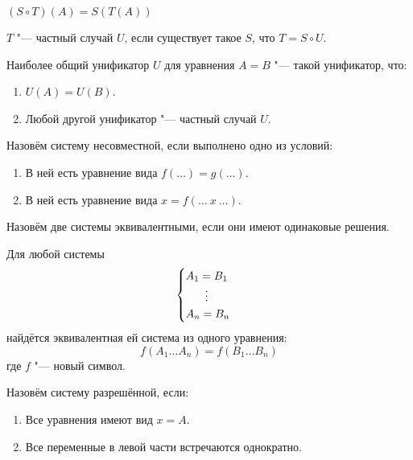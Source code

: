 \begin{definition}[композиция]
    $(S \circ T)(A) = S(T(A))$
\end{definition}

\begin{definition}
    $T$ "--- частный случай $U$, если существует такое $S$, что $T = S \circ U$.
\end{definition}

\begin{definition}
    Наиболее общий унификатор $U$ для уравнения $A=B$ "--- такой унификатор, что:
    \begin{enumerate}
        \item $U(A)=U(B)$.
        \item Любой другой унификатор "--- частный случай $U$.
    \end{enumerate}
\end{definition}

\begin{definition}
    Назовём систему несовместной, если выполнено одно из условий:
    \begin{enumerate}
        \item В ней есть уравнение вида $f(\ldots)=g(\ldots)$.
        \item В ней есть уравнение вида $x = f(\ldots~x~\ldots)$.
    \end{enumerate}
\end{definition}

\begin{definition}
    Назовём две системы эквивалентными, если они имеют одинаковые решения.
\end{definition}

\begin{statement}
    Для любой системы
    \[
        \begin{cases}
            A_1 = B_1 \\
            \phantom{A_1} \mathrel{\makebox[\widthof{=}]{\vdots}} \\
            A_n = B_n
        \end{cases}
    \]
    найдётся эквивалентная ей система из одного уравнения:
    \[
        f(A_1 \ldots A_n) = f(B_1 \ldots B_n)
    \]
    где $f$ "--- новый символ.
\end{statement}

\begin{definition}
    Назовём систему разрешённой, если:
    \begin{enumerate}
        \item Все уравнения имеют вид $x = A$.
        \item Все переменные в левой части встречаются однократно.
    \end{enumerate}
\end{definition}


